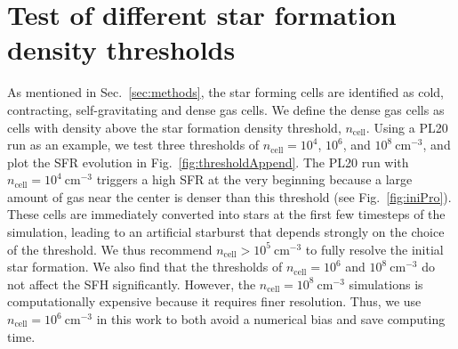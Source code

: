 \documentclass[fleqn,usenatbib]{mnras}
\begin{document}







\appendix

\section{Test of different star formation density thresholds}
\label{append:threshold}

As mentioned in Sec.~\ref{sec:methods}, the star forming cells are identified as cold, contracting, self-gravitating and dense gas cells. We define the dense gas cells as cells with density above the star formation density threshold, $n_\mathrm{cell}$. Using a PL20 run as an example, we test three thresholds of $n_\mathrm{cell}=10^4$, $10^6$, and $10^8\ \mathrm{cm^{-3}}$, and plot the SFR evolution in Fig.~\ref{fig:thresholdAppend}. 
The PL20 run with $n_\mathrm{cell}=10^4\ \mathrm{cm^{-3}}$ triggers a high SFR at the very beginning because a large amount of gas near the center is denser than this threshold (see Fig.~\ref{fig:iniPro}). These cells are immediately converted into stars at the first few timesteps of the simulation, leading to an artificial starburst that depends strongly on the choice of the threshold. We thus recommend $n_\mathrm{cell}>10^5\ \mathrm{cm^{-3}}$ to fully resolve the initial star formation. We also find that the thresholds of $n_\mathrm{cell}=10^6$ and $10^8\ \mathrm{cm^{-3}}$ do not affect the SFH significantly. However, the $n_\mathrm{cell}=10^8\ \mathrm{cm^{-3}}$ simulations is computationally expensive because it requires finer resolution. Thus, we use $n_\mathrm{cell}=10^6~\mathrm{cm^{-3}}$ in this work to both avoid a numerical bias and save computing time.
\end{document}
